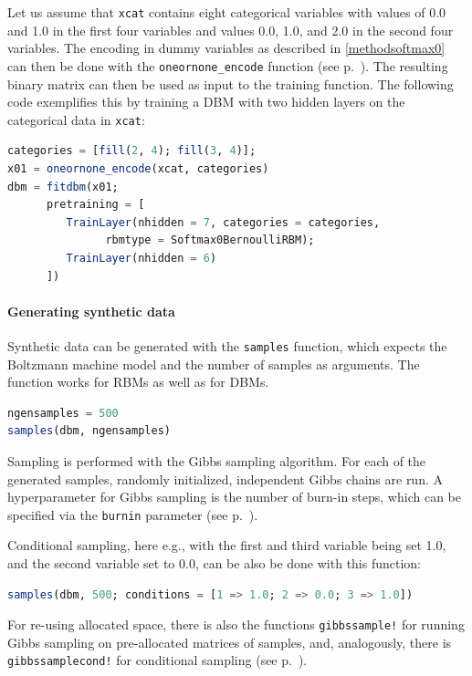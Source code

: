 \documentclass[12pt]{article}
\newcommand{\inlinecode}[1]{\texttt{#1}}
\begin{document}
Let us assume that \inlinecode{xcat} contains eight categorical variables with values of 0.0 and 1.0 in the first four variables and values 0.0, 1.0, and 2.0 in the second four variables.
The encoding in dummy variables as described in \ref{methodsoftmax0} can then be done with the \inlinecode{oneornone\_encode} function (see p.\ \pageref{bms_oneornone_encode}).
The resulting binary matrix can then be used as input to the training function.
The following code exemplifies this by training a DBM with two hidden layers on the categorical data in \inlinecode{xcat}:

\begin{lstlisting}[language=Julia]
categories = [fill(2, 4); fill(3, 4)];
x01 = oneornone_encode(xcat, categories)
dbm = fitdbm(x01;
      pretraining = [
         TrainLayer(nhidden = 7, categories = categories,
               rbmtype = Softmax0BernoulliRBM);
         TrainLayer(nhidden = 6)
      ])
\end{lstlisting}

\paragraph{Generating synthetic data}\label{usagesampling}
Synthetic data can be generated with the \inlinecode{samples} function, which expects the Boltzmann machine model and the number of samples as arguments.
The function works for RBMs as well as for DBMs.

\begin{lstlisting}[language=Julia]
ngensamples = 500
samples(dbm, ngensamples)
\end{lstlisting}

Sampling is performed with the Gibbs sampling algorithm.
For each of the generated samples, randomly initialized, independent Gibbs chains are run.
A hyperparameter for Gibbs sampling is the number of burn-in steps, which can be specified via the \inlinecode{burnin} parameter (see p.\ \pageref{bms_samples}).

Conditional sampling, here e.g., with the first and third variable being set 1.0, and the second variable set to 0.0, can be also be done with this function:

\begin{lstlisting}[language=Julia]
samples(dbm, 500; conditions = [1 => 1.0; 2 => 0.0; 3 => 1.0])
\end{lstlisting}

For re-using allocated space, there is also the functions \inlinecode{gibbssample!} for running Gibbs sampling on pre-allocated matrices of samples, and, analogously, there is \inlinecode{gibbssamplecond!} for conditional sampling (see p.\ \pageref{bms_gibbssample!}).
\end{document}
